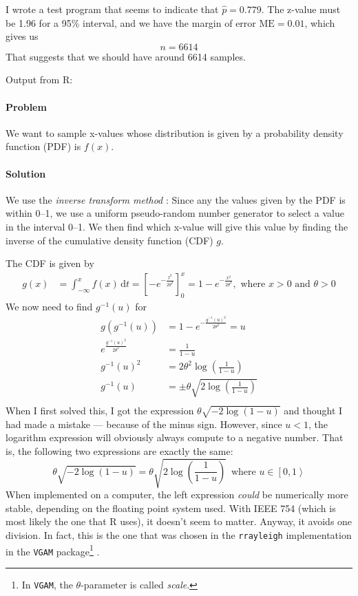 \documentclass[a4paper,english,12pt]{article}
\begin{document}
I wrote a test program that seems to indicate that $\hat{p} = 0.779$. The
z-value must be 1.96 for a 95\%{} interval, and we have the margin of error
$\text{ME} = 0.01$, which gives us
\[
  n = 6614
\]
That suggests that we should have around 6614 samples.

Output from R:

\label{problem:3a}
\paragraph{Problem} We want to sample x-values whose distribution is given by a
probability density function (PDF) is $f(x)$.

\paragraph{Solution} We use the \textit{inverse transform method}
\cite{wiki:inverse.transform.method}: Since any the values given by the PDF is
within 0--1, we use a uniform pseudo-random number generator to select a value
in the interval 0--1. We then find which x-value will give this value by
finding the inverse of the cumulative density function (CDF) $g$.

The CDF is given by
\begin{align*}
  g(x) & = \int_{-\infty}^{x} f(x)\, \mathrm{d}t 
     = \left[ -e^{-\frac{t^2}{2\theta^2}} \right]_0^{x} = 
     1 - e^{-\frac{x^2}{2\theta^2}}, \text{ where } x>0 \text{ and } \theta > 0
\end{align*}
We now need to find $g^{-1}(u)$ for
\begin{align*}
  g(g^{-1}(u)) &= 1 - e^{-\frac{g^{-1}(u)^2}{2\theta^2}} = u \\
   e^\frac{g^{-1}(u)^2}{2\theta^2}  &= \frac{1}{1 - u} \\
   g^{-1}(u)^2  &= 2\theta^2\log{\left(\frac{1}{1 - u}\right)} \\
   g^{-1}(u)  &= \pm\theta\sqrt{2\log{\left(\frac{1}{1 - u}\right)}} \\
\end{align*}
When I first solved this, I got the expression $\theta\sqrt{-2\log{(1-u)}}$ and
thought I had made a mistake --- because of the minus sign. However, since
$u<1$, the logarithm expression will obviously always compute to a negative
number. That is, the following two expressions are exactly the same:
\[
  \theta\sqrt{-2\log{(1-u)}} = \theta\sqrt{2\log{\left(\frac{1}{1-u}\right)}}\,
  \text{ where } u \in \left[0,1\right>
\]
When implemented on a computer, the left expression \textit{could} be
numerically more stable, depending on the floating point system used. With IEEE
754 (which is most likely the one that R uses), it doesn't seem to matter.
Anyway, it avoids one division. In fact, this is the one that was chosen in the
\texttt{rrayleigh} implementation in the \texttt{VGAM} package\footnote{In
\texttt{VGAM}, the $\theta$-parameter is called \textit{scale}.}
\cite{github:vgam}.
\end{document}
